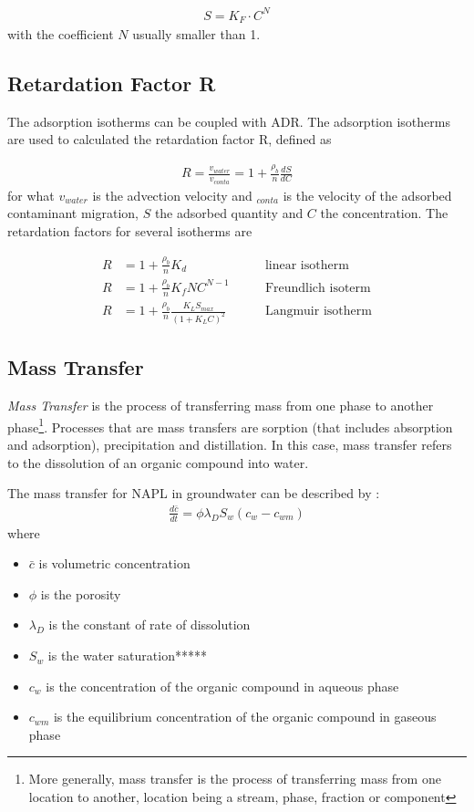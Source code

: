 \documentclass[11pt,twoside]{report}
\begin{document}
\begin{align}
   S = K_{F} \cdot C^{N}
\end{align}
with the coefficient $N$ usually smaller than 1.

\subsection{Retardation Factor R}
The adsorption isotherms can be coupled with ADR. The adsorption isotherms are used to calculated the retardation factor R, defined as 

\begin{align}
   R = \frac{v_{water}}{v_{conta}} = 1 + \frac{\rho_{b}}{n}\frac{dS}{dC}
\end{align}
for what $v_{water}$ is the advection velocity and $_{conta}$ is the velocity of the adsorbed contaminant migration, $S$ the adsorbed quantity and $C$ the concentration. The retardation factors for several isotherms are

\begin{align}
   R &= 1 + \frac{\rho_{b}}{n}K_{d} & \qquad \text{linear isotherm} \\
   R &= 1 + \frac{\rho_{b}}{n}K_{f}NC^{N-1} & \qquad \text{Freundlich isoterm} \\
   R &= 1 + \frac{\rho_{b}}{n}\frac{K_{L}S_{max}}{(1 + K_{L}C)^{2}} & \qquad \text{Langmuir isotherm}
\end{align}


\subsection{Mass Transfer}
\textit{Mass Transfer} is the process of transferring mass from one phase to another phase\footnote{More generally, mass transfer is the process of transferring mass from one location to another, location being a stream, phase, fraction or component}. Processes that are mass transfers are sorption (that includes absorption and adsorption), precipitation and distillation. In this case, mass transfer refers to the dissolution of an organic compound into water.

The mass transfer for NAPL in groundwater can be described by \cite{molson1998}:
\begin{align}
   \frac{d\bar{c}}{dt} = \phi \lambda_{D}S_{w}\left(c_{w} - c_{wm} \right)
\end{align}
where
\begin{itemize}
   \item $\bar{c}$ is volumetric concentration
   \item $\phi$ is the porosity
   \item $\lambda_{D}$ is the constant of rate of dissolution
   \item $S_{w}$ is the water saturation*****
   \item $c_{w}$ is the concentration of the organic compound in aqueous phase
   \item $c_{wm}$ is the equilibrium concentration of the organic compound in gaseous phase 
\end{itemize}
\end{document}
